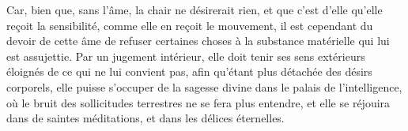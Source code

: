 Car, bien que, sans l’âme, la chair ne désirerait rien,
	et que c’est d’elle qu’elle reçoit la sensibilité,
	comme elle en reçoit le mouvement,
	il est cependant du devoir de cette âme de refuser certaines choses
	à la substance matérielle qui lui est assujettie.
Par un jugement intérieur,
	elle doit tenir ses sens extérieurs éloignés de ce qui ne lui convient pas,
	afin qu’étant plus détachée des désirs corporels,
	elle puisse s’occuper de la sagesse divine dans le palais de l’intelligence,
	où le bruit des sollicitudes terrestres ne se fera plus entendre,
	et elle se réjouira dans de saintes méditations,
	et dans les délices éternelles.
